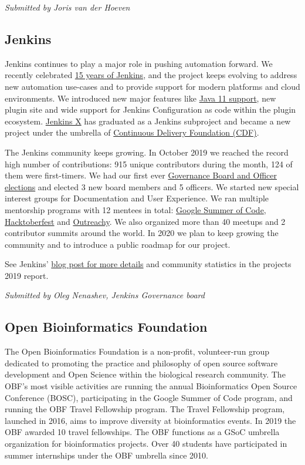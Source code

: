 \documentclass[a4paper]{report}
\begin{document}
{\em Submitted by Joris van der Hoeven}

\subsection{Jenkins}

Jenkins continues to play a major role in pushing automation forward. We
recently celebrated
\href{https://cd.foundation/announcement/2019/08/14/jenkins-celebrates-15-years/}{15
years of Jenkins}, and the project keeps evolving to address new
automation use-cases and to provide support for modern platforms and
cloud environments. We introduced new major features like
\href{https://jenkins.io/blog/2019/03/11/let-s-celebrate-java-11-support/}{Java
11 support}, new plugin site and wide support for Jenkins Configuration
as code within the plugin ecosystem.
\href{https://jenkins-x.io/}{Jenkins X} has graduated as a Jenkins
subproject and became a new project under the umbrella of
\href{https://cd.foundation/}{Continuous Delivery Foundation (CDF)}.

The Jenkins community keeps growing. In October 2019 we reached the
record high number of contributions: 915 unique contributors during the
month, 124 of them were first-timers. We had our first ever
\href{https://jenkins.io/blog/2019/12/16/board-election-results/}{Governance
Board and Officer elections} and elected 3 new board members and 5
officers. We started new special interest groups for Documentation and
User Experience. We ran multiple mentorship programs with 12 mentees in
total: \href{https://jenkins.io/projects/gsoc/2019/}{Google Summer of
Code}, \href{https://jenkins.io/events/hacktoberfest/}{Hacktoberfest}
and
\href{https://jenkins.io/blog/2019/09/23/outreachy-audit-log-release/}{Outreachy}.
We also organized more than 40 meetups and 2 contributor summits around
the world. In 2020 we plan to keep growing the community and to
introduce a public roadmap for our project.

See Jenkins'
\href{https://jenkins.io/blog/2020/01/07/happy-new-year/}{blog post for
more details} and community statistics in the projects 2019 report.

{\em Submitted by Oleg Nenashev, Jenkins Governance board}

\subsection{Open Bioinformatics Foundation}

The Open Bioinformatics Foundation is a non-profit, volunteer-run group
dedicated to promoting the practice and philosophy of open source
software development and Open Science within the biological research
community. The OBF’s most visible activities are running the annual
Bioinformatics Open Source Conference (BOSC), participating in the
Google Summer of Code program, and running the OBF Travel Fellowship
program. The Travel Fellowship program, launched in 2016, aims to
improve diversity at bioinformatics events. In 2019 the OBF awarded 10
travel fellowships. The OBF functions as a GSoC umbrella organization
for bioinformatics projects.  Over 40 students have participated in
summer internships under the OBF umbrella since 2010.
\end{document}
